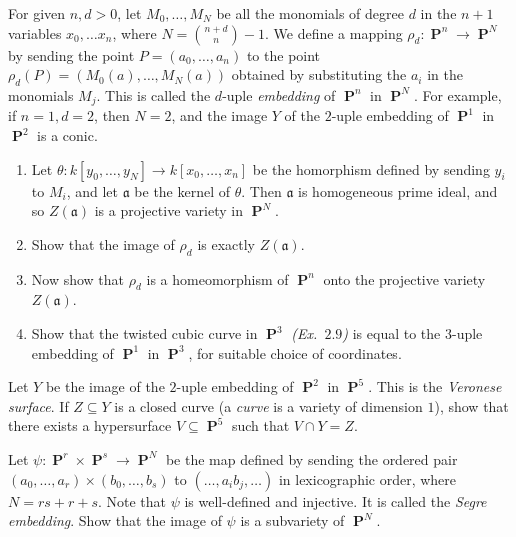 \documentclass{hw_pset} %
\DeclareMathOperator{\pp}{\mathbf{P}} %
\begin{document}
\begin{exercise}[2.12]
    For given $n, d>0$, let
    $M_0,\ldots, M_N$ be all the monomials of degree $d$ in the $n+1$ variables
    $x_0, \ldots x_n$, where $N = \binom{n+d}{n} -1.$ We define a mapping
    $\rho_d\colon \pp^n \to \pp^N$ by sending the point $P = (a_0, \ldots, a_n)$
    to the point $\rho_d(P) = (M_0(a), \ldots, M_N(a))$ obtained by substituting
    the $a_i$ in the monomials $M_j$. This is called the $d$-uple \emph{embedding}
    of $\pp^n$ in $\pp^N$. For example, if $n=1, d=2$, then $N= 2$, and the image
    $Y$ of the $2$-uple embedding of $\pp^1$ in $\pp^2$ is a conic. 
    \begin{enumerate}
      \item Let $\theta\colon k[y_0, \ldots, y_N] \to k[x_0, \ldots, x_n]$ be the
        homorphism defined by sending $y_i$ to $M_i$, and let $\mathfrak{a}$ be
        the kernel of $\theta$. Then $\mathfrak{a}$ is homogeneous prime ideal, and
        so $Z(\mathfrak{a})$ is a projective variety in $\pp^N$. 
      \item Show that the image of $\rho_d$ is exactly $Z(\mathfrak{a})$.
      \item Now show that $\rho_d$ is a homeomorphism of $\pp^n$ onto the projective
        variety $Z(\mathfrak{a})$. 
      \item Show that the twisted cubic curve in $\pp^3$
        {\emph{(Ex.\ $2.9$)}} is equal to the $3$-uple
        embedding of $\pp^1$ in $\pp^3$, for suitable choice of coordinates. 
    \end{enumerate}
\end{exercise}

\begin{solution}
    
\end{solution}

\begin{exercise}[2.13]
    Let $Y$ be the image of the $2$-uple embedding of $\pp^2$ in $\pp^5$. This is the
    \emph{Veronese surface}. If $Z \subseteq Y$ is a closed curve (a \emph{curve} is 
    a variety of dimension $1$), show that there exists a hypersurface $V \subseteq
    \pp^5$ such that $V \cap Y = Z$. 
\end{exercise}

\begin{solution}
    
\end{solution}

\begin{exercise}[2.14]
    Let $\psi\colon \pp^r \times \pp^s \to \pp^N$ be the map defined by sending
    the ordered pair $(a_0, \ldots, a_r) \times (b_0, \ldots, b_s)$ to $(\ldots,
    a_ib_j, \ldots)$ in lexicographic order, where $N = rs + r +s$. Note that
    $\psi$ is well-defined and injective. It is called the \emph{Segre embedding}.
    Show that the image of $\psi$ is a subvariety of $\pp^N$.
\end{exercise}
\end{document}
